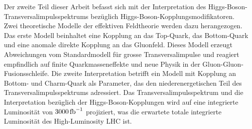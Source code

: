 % 
Der zweite Teil dieser Arbeit befasst sich mit der Interpretation des 
Higgs-Boson-Transversalimpulsspektrums bez{\"u}glich 
Higgs-Boson-Kopplungsmodifikatoren. Zwei theoretische Modelle der 
effektiven Feldtheorie werden dazu herangezogen.
% 
% 
Das erste Modell beinhaltet eine Kopplung an das Top-Quark, das 
Bottom-Quark und eine anomale direkte Kopplung an das Gluonfeld. %
% 
% 
Dieses Modell erzeugt Abweichungen vom Standardmodell f{\"u}r grosse 
Transversalimpulse und reagiert empfindlich auf finite %
Quarkmasseneffekte und neue Physik in der Gluon-Gluon-Fusionsschleife.
% 
% 
Die zweite Interpretation betrifft ein Modell mit Kopplung an Bottom- 
und Charm-Quark als Parameter, das den niederenergetischen Teil des 
Transversalimpulsspektrums adressiert.
% 
% 
Das Transversalimpulsspektrum und die Interpretation bez{\"u}glich der 
Higgs-Boson-Kopplungen wird auf eine integrierte Luminosit{\"a}t von
$3000\,\text{fb}^{-1}$ projiziert, was die erwartete totale integrierte Luminosit{\"a}t des 
High-Luminosity LHC ist.



